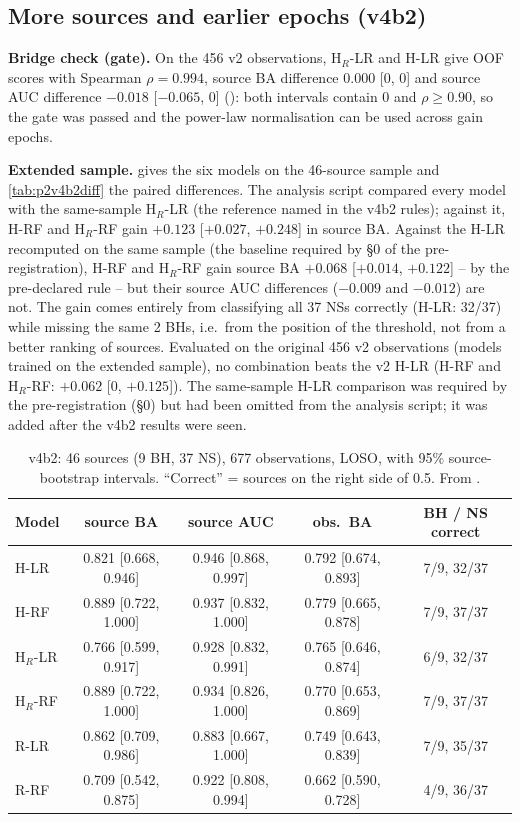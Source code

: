 \subsection{More sources and earlier epochs (v4b2)}\label{sec:p2v4b2}
\textbf{Bridge check (gate).} On the 456 v2 observations, H$_R$-LR and H-LR give OOF scores with Spearman
$\rho=0.994$, source BA difference $0.000$ [0, 0] and source AUC difference $-0.018$ [$-0.065$, 0]
(): both intervals contain 0 and $\rho\ge0.90$, so the gate was passed and
the power-law normalisation can be used across gain epochs.

\textbf{Extended sample.} \Secondary{}  gives the six models on the 46-source sample and
\cref{tab:p2v4b2diff} the paired differences. The analysis script compared every model with the same-sample H$_R$-LR (the
reference named in the v4b2 rules); against it, H-RF and H$_R$-RF gain $+0.123$ [$+0.027$, $+0.248$] in source BA. Against the
H-LR recomputed on the same sample (the baseline required by \S0 of the pre-registration), H-RF and H$_R$-RF gain source BA $+0.068$ [$+0.014$, $+0.122$] -- \Detected{} by the
pre-declared rule -- but their source AUC differences ($-0.009$ and $-0.012$) are not. The gain comes entirely from
classifying all 37 NSs correctly (H-LR: 32/37) while missing the same 2 BHs, i.e.\ from the position of the threshold,
not from a better ranking of sources. Evaluated on the original 456 v2 observations (models trained on the extended
sample), no combination beats the v2 H-LR (H-RF and H$_R$-RF: $+0.062$ [0, $+0.125$]). The same-sample H-LR comparison was
required by the pre-registration (\S0) but had been omitted from the analysis script; it was added after the v4b2 results
were seen.

\begin{table}[htbp]
\centering\small
\caption[v4b2 extended sample]{\Secondary{} v4b2: 46 sources (9 BH, 37 NS), 677 observations, LOSO, with 95\%
source-bootstrap intervals. ``Correct'' = sources on the right side of 0.5. From .}
\label{tab:p2v4b2}
\footnotesize\setlength{\tabcolsep}{4pt}
\begin{tabular}{@{}lcccc@{}}
\toprule
Model & source BA & source AUC & obs.\ BA & BH / NS correct \\
\midrule
H-LR & 0.821 [0.668, 0.946] & 0.946 [0.868, 0.997] & 0.792 [0.674, 0.893] & 7/9, 32/37 \\
H-RF & 0.889 [0.722, 1.000] & 0.937 [0.832, 1.000] & 0.779 [0.665, 0.878] & 7/9, 37/37 \\
H$_R$-LR & 0.766 [0.599, 0.917] & 0.928 [0.832, 0.991] & 0.765 [0.646, 0.874] & 6/9, 32/37 \\
H$_R$-RF & 0.889 [0.722, 1.000] & 0.934 [0.826, 1.000] & 0.770 [0.653, 0.869] & 7/9, 37/37 \\
R-LR & 0.862 [0.709, 0.986] & 0.883 [0.667, 1.000] & 0.749 [0.643, 0.839] & 7/9, 35/37 \\
R-RF & 0.709 [0.542, 0.875] & 0.922 [0.808, 0.994] & 0.662 [0.590, 0.728] & 4/9, 36/37 \\
\bottomrule
\end{tabular}
\end{table}

